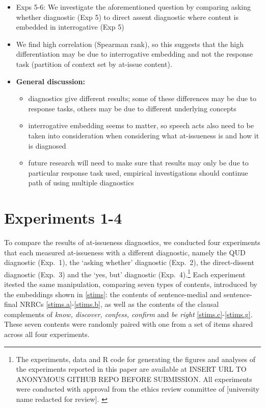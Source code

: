 \documentclass[times,linguex,xcolor]{glossa}
\begin{document}
\begin{itemize}[leftmargin=12pt]
  \item Exps 5-6: We investigate the aforementioned question by comparing asking whether diagnostic (Exp 5) to direct assent diagnostic where content is embedded in interrogative (Exp 5)

  \item We find high correlation (Spearman rank), so this suggests that the high differentiation may be due to interrogative embedding and not the response task (partition of context set by at-issue content). 

  \item {\bf General discussion:} 

  \begin{itemize}

  \item diagnostics give different results; some of these differences may be due to response tasks, others may be due to different underlying concepts

  \item interrogative embedding seems to matter, so speech acts also need to be taken into consideration when considering what at-issueness is and how it is diagnosed

  \item future research will need to make sure that results may only be due to particular response task used, empirical investigations should continue path of using multiple diagnostics 

  \end{itemize}

  \end{itemize}


    
  \newpage


\section{Experiments 1-4 \label{sec:2_experiments}}

  To compare the results of at-issueness diagnostics, we conducted four experiments that each measured at-issueness with a different diagnostic, namely the QUD diagnostic (Exp.~1), the `asking whether' diagnostic (Exp.~2), the direct-dissent diagnostic (Exp.~3) and the `yes, but' diagnostic (Exp.~4).\footnote{The experiments, data and R code for generating the figures and analyses of the experiments reported in this paper are available at INSERT URL TO ANONYMOUS GITHUB REPO BEFORE SUBMISSION. All experiments were conducted with approval from the ethics review committee of [university name redacted for review]. \label{f:github}}
  Each experiment itested the same manipulation, comparing seven types of contents, introduced by the embeddings shown in \ref{stims}: the contents of sentence-medial and sentence-final NRRCs \ref{stims.a}-\ref{stims.b}, as well as the contents of the clausal complements of \emph{know, discover, confess, confirm} and \emph{be right} \ref{stims.c}-\ref{stims.g}. These seven contents were randomly paired with one from a set of items shared across all four experiments.
\end{document}
